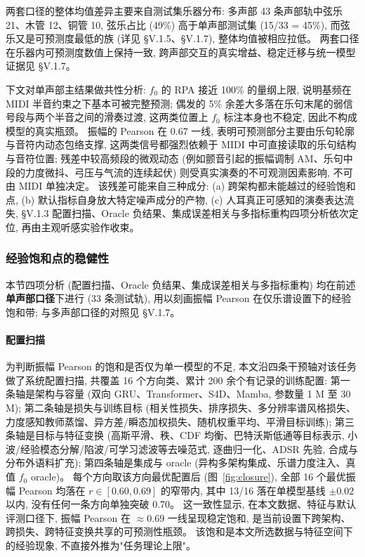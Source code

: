\documentclass[a4paper, UTF8, zihao=-4, fontset=fandol]{ctexart}
\begin{document}
两套口径的整体均值差异主要来自测试集乐器分布: 多声部 43 条声部轨中弦乐 21、木管 12、铜管 10, 弦乐占比 (49\%) 高于单声部测试集 (15/33 = 45\%), 而弦乐又是可预测度最低的族 (详见 §V.1.5、§V.1.7), 整体均值被相应拉低。 两套口径在乐器内可预测度数值上保持一致, 跨声部交互的真实增益、稳定迁移与统一模型证据见 §V.1.7。

下文对单声部主结果做共性分析: $f_0$ 的 RPA 接近 100\% 的量纲上限, 说明基频在 MIDI 半音约束之下基本可被完整预测; 偶发的 5\% 余差大多落在乐句末尾的弱信号段与两个半音之间的滑奏过渡, 这两类位置上 $f_0$ 标注本身也不稳定, 因此不构成模型的真实瓶颈。 振幅的 Pearson 在 0.67 一线, 表明可预测部分主要由乐句轮廓与音符内动态包络支撑, 这两类信号都强烈依赖于 MIDI 中可直接读取的乐句结构与音符位置; 残差中较高频段的微观动态 (例如颤音引起的振幅调制 AM、乐句中段的力度微抖、弓压与气流的连续起伏) 则受真实演奏的不可观测因素影响, 不可由 MIDI 单独决定。 该残差可能来自三种成分: (a) 跨架构都未能越过的经验饱和点, (b) 默认指标自身放大特定噪声成分的产物, (c) 人耳真正可感知的演奏表达流失, §V.1.3 配置扫描、Oracle 负结果、集成误差相关与多指标重构四项分析依次定位, 再由主观听感实验作收束。

\subsubsection{经验饱和点的稳健性}

本节四项分析 (配置扫描、Oracle 负结果、集成误差相关与多指标重构) 均在前述\textbf{单声部口径}下进行 (33 条测试轨), 用以刻画振幅 Pearson 在仅乐谱设置下的经验饱和带; 与多声部口径的对照见 §V.1.7。

\paragraph{配置扫描}\quad
为判断振幅 Pearson 的饱和是否仅为单一模型的不足, 本文沿四条干预轴对该任务做了系统配置扫描, 共覆盖 16 个方向类、累计 200 余个有记录的训练配置: 第一条轴是架构与容量 (双向 GRU、Transformer、S4D、Mamba, 参数量 1 M 至 30 M); 第二条轴是损失与训练目标 (相关性损失、排序损失、多分辨率谱风格损失、力度感知教师蒸馏、异方差/瞬态加权损失、随机权重平均、平滑目标训练); 第三条轴是目标与特征变换 (高斯平滑、秩、CDF 均衡、巴特沃斯低通等目标表示, 小波/经验模态分解/陷波/可学习滤波等去噪范式, 逐曲归一化、ADSR 先验, 合成与分布外语料扩充); 第四条轴是集成与 oracle (异构多架构集成、乐谱力度注入、真值 $f_0$ oracle)。 每个方向取该方向最优配置后 (图~\ref{fig:closure}), 全部 16 个最优振幅 Pearson 均落在 $r \in [0.60, 0.69]$ 的窄带内, 其中 13/16 落在单模型基线 $\pm 0.02$ 以内, 没有任何一条方向单独突破 0.70。 这一致性显示, 在本文数据、特征与默认评测口径下, 振幅 Pearson 在 $\approx 0.69$ 一线呈现稳定饱和, 是当前设置下跨架构、跨损失、跨特征变换共享的可预测性瓶颈。 该饱和是本文所选数据与特征空间下的经验现象, 不直接外推为"任务理论上限"。
\end{document}
